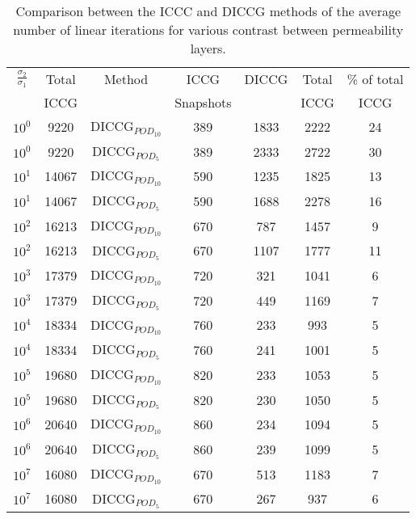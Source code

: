 \documentclass[12pt]{article}
\begin{document}
\begin{table}[!ht]\centering
\begin{minipage}{1\textwidth}
 \centering
\begin{tabular}{ ||c|c||c|c|c|c|c||} 
\hline
$\frac{\sigma_2}{\sigma_1}$&Total&Method  & ICCG&DICCG &Total&\% of total\\ 
                           & ICCG     &  & Snapshots& &ICCG& ICCG\\ 
\hline  
$10^{0}$ &9220& DICCG$_{POD_{10}}$&389&1833&2222&24 \\ 
\hline  
$10^{0}$ &9220& DICCG$_{POD_{5}}$&389&2333&2722&30 \\ 
\hline 
$10^{1}$ &14067& DICCG$_{POD_{10}}$&590&1235&1825&13 \\ 
\hline  
$10^{1}$ &14067& DICCG$_{POD_{5}}$&590&1688&2278&16 \\ 
\hline 
$10^{2}$ &16213& DICCG$_{POD_{10}}$&670&787&1457&9 \\ 
\hline  
$10^{2}$ &16213& DICCG$_{POD_{5}}$&670&1107&1777&11 \\ 
\hline 
$10^{3}$ &17379& DICCG$_{POD_{10}}$&720&321&1041&6 \\ 
\hline  
$10^{3}$ &17379& DICCG$_{POD_{5}}$&720&449&1169&7 \\ 
\hline  
$10^{4}$ &18334& DICCG$_{POD_{10}}$&760&233&993&5 \\ 
\hline  
$10^{4}$ &18334& DICCG$_{POD_{5}}$&760&241&1001&5 \\ 
\hline  
$10^{5}$ &19680& DICCG$_{POD_{10}}$&820&233&1053&5 \\ 
\hline  
$10^{5}$ &19680& DICCG$_{POD_{5}}$&820&230&1050&5 \\ 
\hline 
$10^{6}$ &20640& DICCG$_{POD_{10}}$&860&234&1094&5 \\ 
\hline  
$10^{6}$ &20640& DICCG$_{POD_{5}}$&860&239&1099&5 \\ 
\hline 
$10^{7}$ &16080& DICCG$_{POD_{10}}$&670&513&1183&7 \\ 
\hline  
$10^{7}$ &16080& DICCG$_{POD_{5}}$&670&267&937&6 \\ 
\hline  
\end{tabular} 
\caption{Comparison between the ICCC and DICCG methods of the average number of linear iterations  for various contrast between permeability layers. }\label{table:litertotw2} 
\end{minipage}  
\end{table}  
\end{document}
